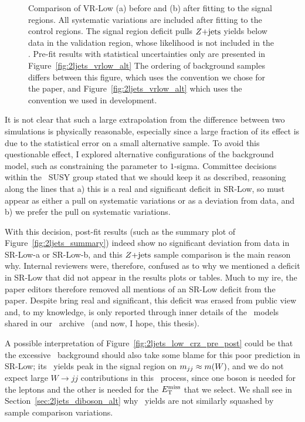 \begin{figure}[tp]
\begin{subfigure}{0.48\textwidth}
\end{subfigure}
\caption[
Comparison of VR-Low before and after fitting to the signal regions
]{%
Comparison of VR-Low (a) before and (b) after fitting to the signal regions.
All systematic variations are included after fitting to the control regions.
The signal region deficit pulls $Z\mathrm{+jets}$ yields below data in the validation
region, whose likelihood is not included in the \heplikelihood.
Pre-fit results with statistical uncertainties only are presented in
Figure~\ref{fig:2ljets_vrlow_alt}
The ordering of background samples differs between this figure,
which uses the convention we chose for the paper, and
Figure~\ref{fig:2ljets_vrlow_alt} which uses the convention we used in
development.
}
\label{fig:2ljets_low_vrlow_pre_post}
\end{figure}

It is not clear that such a large extrapolation from the difference between
two simulations is physically reasonable, especially since a large fraction
of its effect is due to the statistical error on a small alternative sample.
To avoid this questionable effect, I explored alternative configurations
of the background model, such as constraining the parameter to $1$-sigma.
Committee decisions within the \atlas\ SUSY group stated that we should keep
it as described, reasoning along the lines that
a) this is a real and significant deficit in SR-Low, so must appear as either
a pull on systematic variations or as a deviation from data, and
b) we prefer the pull on systematic variations.

With this decision, post-fit results (such as the summary plot of
Figure~\ref{fig:2ljets_summary})
indeed show no significant deviation from data in SR-Low-a or SR-Low-b,
and this $Z\mathrm{+jets}$ sample comparison is the main reason why.
Internal reviewers were, therefore, confused as to why we mentioned a deficit
in SR-Low that did not appear in the results plots or tables.
Much to my ire, the paper editors therefore removed all mentions of an SR-Low
deficit from the paper.
Despite bring real and significant, this deficit was erased from public view
and, to my knowledge, is only reported through inner details of
the \histfactory\ models shared in our \hepdata\ archive~\cite{hepdata.116034}
(and now, I hope, this thesis).

A possible interpretation of Figure~\ref{fig:2ljets_low_crz_pre_post} could be
that the excessive \diboson\ background should also take some blame for this
poor prediction in SR-Low;
its \diboson\ yields peak in the signal region on $m_{jj} \approx m(W)$, and
we do not expect large $W\to jj$ contributions in this \diboson\
process, since one boson is needed for the leptons and the other is needed for
the $E_\mathrm{T}^\mathrm{miss}$ that we select.
We shall see in Section~\ref{sec:2ljets_diboson_alt} why \diboson\ yields are
not similarly squashed by sample comparison variations.


